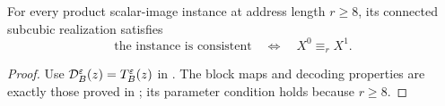 \begin{corollary}
\label{cor:subcubic-game}
For every product scalar-image instance at address length \(r\ge8\),
its connected subcubic realization satisfies
\[
 \text{the instance is consistent}\quad\Longleftrightarrow\quad
 X^0\equiv_r X^1.
\]
\end{corollary}
\begin{proof}
Use \(\mathcal D_B^\varepsilon(z)=T_B^\varepsilon(z)\) in
. The block maps and decoding properties are
exactly those proved in ; its parameter
condition holds because \(r\ge8\).
\end{proof}
